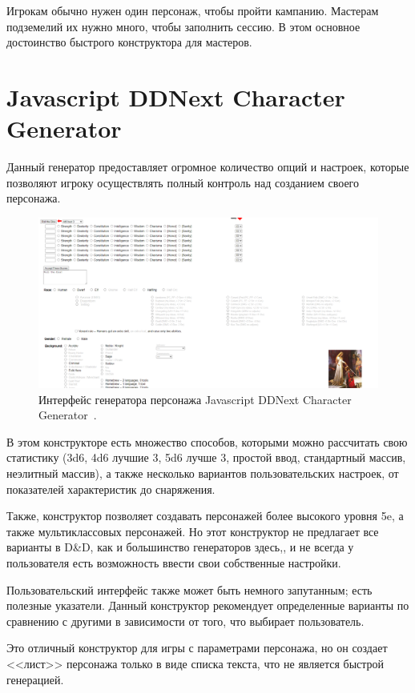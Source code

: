 Игрокам обычно нужен один персонаж, чтобы пройти кампанию. Мастерам подземелий их нужно много, чтобы заполнить сессию. В этом основное достоинство быстрого конструктора для мастеров.

\section{Javascript DDNext Character Generator}

Данный генератор предоставляет огромное количество опций и настроек, которые позволяют игроку осуществлять полный контроль над созданием своего персонажа.

\begin{figure}
    \centering
    \includegraphics[scale=0.3]{DDNext.png}
    \caption{Интерфейс генератора персонажа Javascript DDNext Character Generator~\cite{ddnext}.}
    \label{fig:ddnext}
\end{figure}

В этом конструкторе есть множество способов, которыми можно рассчитать свою статистику (3d6, 4d6 лучшие 3, 5d6 лучше 3, простой ввод, стандартный массив, неэлитный массив), а также несколько вариантов пользовательских настроек, от показателей характеристик до снаряжения. 

Также, конструктор позволяет создавать персонажей более высокого уровня 5e, а также мультиклассовых персонажей. Но этот конструктор не предлагает все варианты в D\&D, как и большинство генераторов здесь,, и не всегда у пользователя есть возможность ввести свои собственные настройки. 

Пользовательский интерфейс также может быть немного запутанным; есть полезные указатели. Данный конструктор рекомендует определенные варианты по сравнению с другими в зависимости от того, что выбирает пользователь.

Это отличный конструктор для игры с параметрами персонажа, но он создает <<лист>> персонажа только в виде списка текста, что не является быстрой генерацией.

